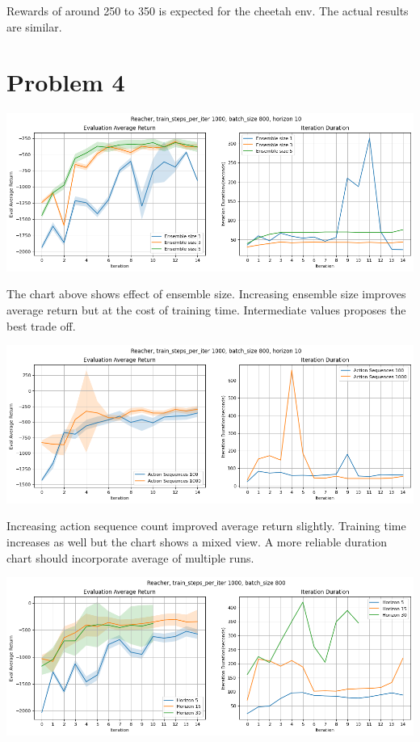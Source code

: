 \documentclass[11pt]{article}
\begin{document}
    Rewards of around 250 to 350 is expected for the cheetah env.
    The actual results are similar.

    \section*{Problem 4}

    \hspace*{-0.6in}
    \includegraphics[scale=0.5]{q4/networks}

    The chart above shows effect of ensemble size.
    Increasing ensemble size improves average return but at the cost of training time.
    Intermediate values proposes the best trade off.

    \hspace*{-0.6in}
    \includegraphics[scale=0.5]{q4/actions}

    Increasing action sequence count improved average return slightly.
    Training time increases as well but the chart shows a mixed view.
    A more reliable duration chart should incorporate average of multiple runs.

    \hspace*{-0.6in}
    \includegraphics[scale=0.5]{q4/horizon}
\end{document}
